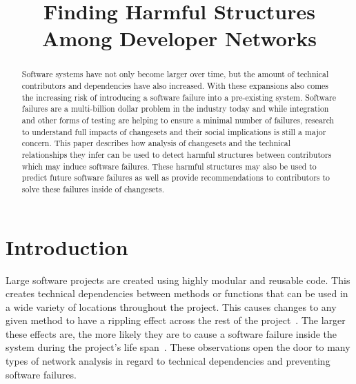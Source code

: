 \documentclass[conference]{IEEEtran}
\begin{document}
\title{Finding Harmful Structures Among Developer Networks}

\author{
}

\maketitle


\begin{abstract}
Software systems have not only become larger over time, but the amount of
technical contributors and dependencies have also increased. With these expansions also comes
the increasing risk of introducing a software failure into a pre-existing system.
Software failures are a multi-billion dollar problem in the industry today and while integration and
other forms of testing are helping to ensure a minimal number of failures, research to understand
full impacts of changesets and their social implications is still a major concern. This paper describes
how analysis of changesets and the technical relationships they infer can be used to detect harmful
structures between contributors which may induce software failures. These harmful structures may
also be used to predict future software failures as well as provide recommendations to contributors
to solve these failures inside of changesets.
\end{abstract}


\section{Introduction}

Large software projects are created using highly modular and 
reusable code. This creates technical dependencies between methods or functions
that can be used in a wide variety of locations throughout the project. 
This causes changes to any given method to have a rippling 
effect across the rest of the project~\cite{Acharya:2011:PCI}. The larger these effects are,
the more likely they are to cause a software failure inside the system during the project's
life span~\cite{Zimmermann:2008:PDU}. These observations open the door to many types
of network analysis in regard to technical dependencies and preventing software failures.
\end{document}
